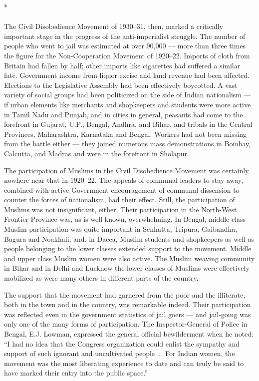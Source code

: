 \begin{multicols}{2}
\begin{center}*\end{center}

\paragraph*{}
The Civil Disobedience Movement of 1930--31, then, marked a critically important stage in the progress of the anti-imperialist struggle. The number of people who went to jail was estimated at over 90,000 --- more than three times the figure for the Non-Cooperation Movement of 1920--22. Imports of cloth from Britain had fallen by half; other imports like cigarettes had suffered a similar fate. Government income from liquor excise and land revenue had been affected. Elections to the Legislative Assembly had been effectively boycotted. A vast variety of social groups had been politicized on the side of Indian nationalism --- if urban elements like merchants and shopkeepers and students were more active in Tamil Nadu and Punjab, and in cities in general, peasants had come to the forefront in Gujarat, U.P., Bengal, Andhra, and Bihar, and tribals in the Central Provinces, Maharashtra, Karnataka and Bengal. Workers had not been missing from the battle either --- they joined numerous mass demonstrations in Bombay, Calcutta, and Madras and were in the forefront in Sholapur.

The participation of Muslims in the Civil Disobedience Movement was certainly nowhere near that in 1920--22. The appeals of communal leaders to stay away, combined with active Government encouragement of communal dissension to counter the forces of nationalism, had their effect. Still, the participation of Muslims was not insignificant, either. Their participation in the North-West Frontier Province was, as is well known, overwhelming. In Bengal, middle class Muslim participation was quite important in Senhatta, Tripura, Gaibandha, Bagura and Noakhali, and. in Dacca, Muslim students and shopkeepers as well as people belonging to the lower classes extended support to the movement. Middle and upper class Muslim women were also active. The Muslim weaving community in Bihar and in Delhi and Lucknow the lower classes of Muslims were effectively mobilized as were many others in different parts of the country.

The support that the movement had garnered from the poor and the illiterate, both in the town and in the country, was remarkable indeed. Their participation was reflected even in the government statistics of jail goers --- and jail-going was only one of the many forms of participation. The Inspector-General of Police in Bengal, E.J. Lowman, expressed the general official bewilderment when he noted: ``I had no idea that the Congress organization could enlist the sympathy and support of such ignorant and uncultivated people ... For Indian women, the movement was the most liberating experience to date and can truly be said to have marked their entry into the public space.''
\end{multicols}
